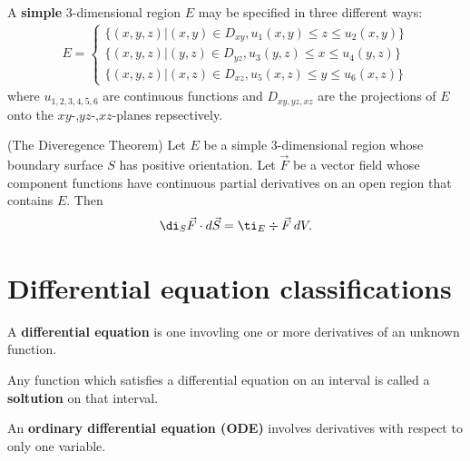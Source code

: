 \documentclass{article}
\begin{document}
\begin{definition}
    A \textbf{simple} 3-dimensional region $E$ may be specified in three different ways:
    \begin{align*}
        E=\begin{cases}
            \{(x,y,z)|(x,y)\in D_{xy}, u_1(x,y)\leq z \leq u_2(x,y)\} \\
            \{(x,y,z)|(y,z)\in D_{yz}, u_3(y,z)\leq x \leq u_4(y,z)\} \\
            \{(x,y,z)|(x,z)\in D_{xz}, u_5(x,z)\leq y \leq u_6(x,z)\}
        \end{cases}
    \end{align*}
    where $u_{1,2,3,4,5,6}$ are continuous functions and $D_{xy,yz,xz}$ are the projections
    of $E$ onto the $xy$-,$yz$-,$xz$-planes repsectively.
\end{definition}
\begin{theorem}(The Diveregence Theorem)
    Let $E$ be a simple 3-dimensional region whose boundary surface $S$ has positive
    orientation. Let $\vec F$ be a vector field whose component functions have continuous
    partial derivatives on an open region that contains $E$. Then
    \begin{align*}
        \di_S \vec F\cdot d\vec S = \ti_E \div\vec F\:dV.
    \end{align*}
\end{theorem}



\section{Differential equation classifications}



\begin{definition}
    A \textbf{differential equation} is one invovling one or more derivatives of an unknown function.
\end{definition}

\begin{definition}
    Any function which satisfies a differential equation on an interval is called a \textbf{soltution} on that interval.
\end{definition}

\begin{definition}
    An \textbf{ordinary differential equation (ODE)} involves derivatives with respect to only one variable.
\end{definition}
\end{document}

